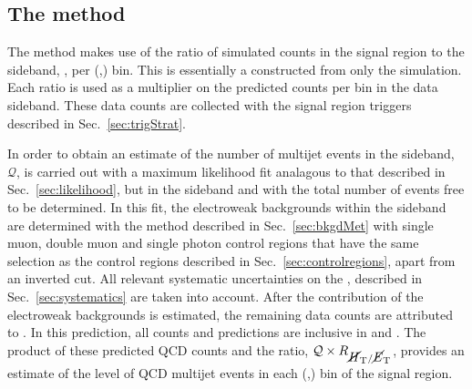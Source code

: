 \subsection{The method}

The method makes use of the ratio of simulated \QCD counts in the
signal region to the \mhtmet sideband, \rmhtmet, per (\HT,\nj) bin.
This is essentially a \TF constructed from only the \QCD simulation.
Each ratio is used as a multiplier on the predicted \QCD counts per
bin in the \mhtmet data sideband.  These data counts are collected
with the signal region triggers described in Sec.~\ref{sec:trigStrat}. 

In order to obtain an estimate of the number of \QCD multijet events in
the sideband, $\mathcal{Q}$, is carried out with a maximum likelihood fit analagous to
that described in Sec.~\ref{sec:likelihood}, but in the \mhtmet
sideband and with the total number of \QCD events free to be
determined. In this fit,
the electroweak backgrounds within the sideband are determined with the method described
in Sec.~\ref{sec:bkgdMet} with single muon, double muon and single
photon control regions that have the same selection as the control
regions described in Sec.~\ref{sec:controlregions}, apart from an inverted
\mhtmet cut. All relevant systematic uncertainties on the \TFs,
described in Sec.~\ref{sec:systematics} are taken into account.  After the
contribution of the electroweak backgrounds is estimated, the
remaining data counts are attributed to \QCD. In this prediction, all
counts and predictions are inclusive in \nb and \MHT. The product of these
predicted QCD counts and the ratio, $\mathcal{Q} \times \mbox{$R_{\mbox{$\cancel{H}_\text{T}$} / \mbox{$\cancel{E}_\text{T}$}}$}$,
provides an estimate of the level of QCD multijet events in each
(\HT,\nj) bin of the signal region. 

